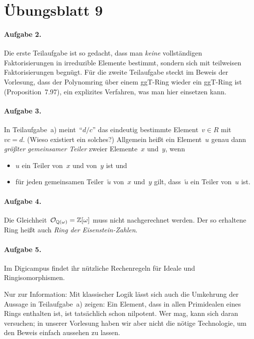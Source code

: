 \documentclass{algblatt}
\newcommand{\hint}[1]{\rotatebox{180}{\vbox{\textcolor{grey}{#1}}}}
\begin{document}
\hint{%
Bei Teilaufgabe~a) lässt sich ein Beispiel über~$R = \ZZ$ finden.
}


\section*{Übungsblatt 9}

\paragraph{Aufgabe 2.} Die erste Teilaufgabe ist so gedacht, dass man
\emph{keine} vollständigen Faktorisierungen in irreduzible Elemente bestimmt,
sondern sich mit teilweisen Faktorisierungen begnügt. Für die zweite
Teilaufgabe steckt im Beweis der Vorlesung, dass der Polynomring über einem
ggT-Ring wieder ein ggT-Ring ist (Proposition~7.97), ein explizites
Verfahren, was man hier einsetzen kann.

\paragraph{Aufgabe 3.} In Teilaufgabe~a) meint~"`$d/c$"' das eindeutig
bestimmte Element~$v \in R$ mit~$vc = d$. (Wieso existiert ein solches?)
Allgemein heißt ein Element~$u$ genau dann \emph{größter gemeinsamer Teiler}
zweier Elemente~$x$ und~$y$, wenn
\begin{itemize}
\item $u$ ein Teiler von~$x$ und von~$y$ ist und
\item für jeden gemeinsamen Teiler~$\widetilde u$ von~$x$ und~$y$ gilt,
dass~$\widetilde u$ ein Teiler von~$u$ ist.
\end{itemize}

\hint{%
Betrachtet für Teilaufgabe~b) den größten gemeinsamen Teiler von~$ac$
und~$bc$.}

\paragraph{Aufgabe 4.} Die Gleichheit~$\mathcal{O}_{\mathbb{Q}(\omega)} = \mathbb{Z}[\omega]$ muss
nicht nachgerechnet werden. Der so erhaltene Ring heißt auch \emph{Ring der
Eisenstein-Zahlen}.

\paragraph{Aufgabe 5.} Im Digicampus findet ihr nützliche Rechenregeln für
Ideale und Ringisomorphismen.

Nur zur Information: Mit klassischer Logik lässt sich auch die Umkehrung der
Aussage in Teilaufgabe~a) zeigen: Ein Element, dass in allen Primidealen eines
Rings enthalten ist, ist tatsächlich schon nilpotent. Wer mag, kann sich daran
versuchen; in unserer Vorlesung haben wir aber nicht die nötige Technologie,
um den Beweis einfach aussehen zu lassen.
\end{document}
